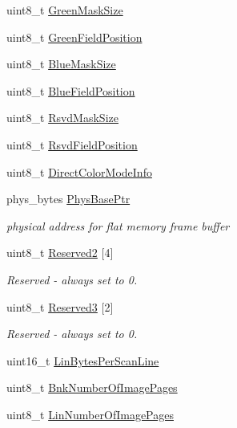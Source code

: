\begin{DoxyCompactItemize}
\item 
uint8\+\_\+t \hyperlink{struct____attribute_____ac7b4df72e505b74493e7d5144cbac743}{Green\+Mask\+Size}
\item 
uint8\+\_\+t \hyperlink{struct____attribute_____a602b28f8e5da781eabfd736743a6ea09}{Green\+Field\+Position}
\item 
uint8\+\_\+t \hyperlink{struct____attribute_____a84842a6a42e881ce7be87482122bcc4e}{Blue\+Mask\+Size}
\item 
uint8\+\_\+t \hyperlink{struct____attribute_____a4d0396c07a4f07556332fec2b4a6c2bf}{Blue\+Field\+Position}
\item 
uint8\+\_\+t \hyperlink{struct____attribute_____a87d544680f1132f30b038c0ebf0b829b}{Rsvd\+Mask\+Size}
\item 
uint8\+\_\+t \hyperlink{struct____attribute_____aa357b085181776f2918a6df25c88846b}{Rsvd\+Field\+Position}
\item 
uint8\+\_\+t \hyperlink{struct____attribute_____a3bf2fd2394ec8649ec3d26104be35dd7}{Direct\+Color\+Mode\+Info}
\item 
phys\+\_\+bytes \hyperlink{struct____attribute_____a1d11f4921094db253fc2c2ee6fbb2afb}{Phys\+Base\+Ptr}
\begin{DoxyCompactList}\small\item\em physical address for flat memory frame buffer \end{DoxyCompactList}\item 
uint8\+\_\+t \hyperlink{struct____attribute_____a09b5824ec5c67bee2a4b36c0ab5181bc}{Reserved2} \mbox{[}4\mbox{]}
\begin{DoxyCompactList}\small\item\em Reserved -\/ always set to 0. \end{DoxyCompactList}\item 
uint8\+\_\+t \hyperlink{struct____attribute_____a2455a82e0d8cc0e8d76e8cf77a68bd39}{Reserved3} \mbox{[}2\mbox{]}
\begin{DoxyCompactList}\small\item\em Reserved -\/ always set to 0. \end{DoxyCompactList}\item 
uint16\+\_\+t \hyperlink{struct____attribute_____a53c5060b6ac14a7418ca8421edfb9981}{Lin\+Bytes\+Per\+Scan\+Line}
\item 
uint8\+\_\+t \hyperlink{struct____attribute_____a33ba903e149724b1bc99b3b8e43a7cbe}{Bnk\+Number\+Of\+Image\+Pages}
\item 
uint8\+\_\+t \hyperlink{struct____attribute_____a3fa2352e69836f4b69b3a344ae761ba8}{Lin\+Number\+Of\+Image\+Pages}

\end{DoxyCompactItemize}
